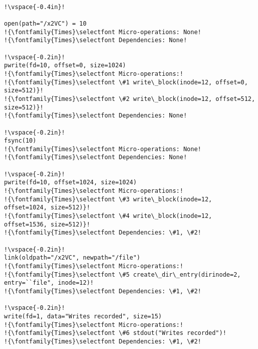 \begin{lstlisting}[float=t, caption = {\textbf{Annotated Update Protocol.}
\textit{\footnotesize The
listing shows an example update protocol. The micro-operations generated for each
system call are shown along with their dependencies. The inode number of \smalltt{x2VC} 
is 12. The inode number of the root directory is 2. Some details of listed system
calls have been elided for brevity.
}}, label = {lst-micro-example}, escapechar=!]

!\vspace{-0.4in}!

open(path="/x2VC") = 10
!{\fontfamily{Times}\selectfont Micro-operations: None!
!{\fontfamily{Times}\selectfont Dependencies: None!

!\vspace{-0.2in}!
pwrite(fd=10, offset=0, size=1024)
!{\fontfamily{Times}\selectfont Micro-operations:!
!{\fontfamily{Times}\selectfont \#1 write\_block(inode=12, offset=0, size=512)}! 
!{\fontfamily{Times}\selectfont \#2 write\_block(inode=12, offset=512, size=512)}! 
!{\fontfamily{Times}\selectfont Dependencies: None!

!\vspace{-0.2in}!
fsync(10)
!{\fontfamily{Times}\selectfont Micro-operations: None!
!{\fontfamily{Times}\selectfont Dependencies: None!

!\vspace{-0.2in}!
pwrite(fd=10, offset=1024, size=1024)
!{\fontfamily{Times}\selectfont Micro-operations:!
!{\fontfamily{Times}\selectfont \#3 write\_block(inode=12, offset=1024, size=512)}! 
!{\fontfamily{Times}\selectfont \#4 write\_block(inode=12, offset=1536, size=512)}! 
!{\fontfamily{Times}\selectfont Dependencies: \#1, \#2!

!\vspace{-0.2in}!
link(oldpath="/x2VC", newpath="/file")
!{\fontfamily{Times}\selectfont Micro-operations:!
!{\fontfamily{Times}\selectfont \#5 create\_dir\_entry(dirinode=2, entry=``file", inode=12)! 
!{\fontfamily{Times}\selectfont Dependencies: \#1, \#2!

!\vspace{-0.2in}!
write(fd=1, data="Writes recorded", size=15)
!{\fontfamily{Times}\selectfont Micro-operations:!
!{\fontfamily{Times}\selectfont \#6 stdout("Writes recorded")! 
!{\fontfamily{Times}\selectfont Dependencies: \#1, \#2!

\end{lstlisting}


